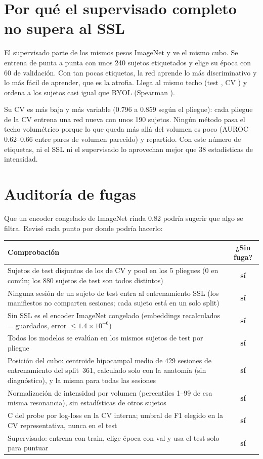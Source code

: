 \documentclass[11pt,a4paper]{article}
\newcommand{\si}{\textcolor{okc}{\textbf{sí}}}
\begin{document}
\section{Por qué el supervisado completo no supera al SSL}

El supervisado parte de los mismos pesos ImageNet y ve el mismo cubo. Se entrena de
punta a punta con unos 240 sujetos etiquetados y elige su época con 60 de validación.
Con tan pocas etiquetas, la red aprende lo más discriminativo y lo más fácil de aprender,
que es la atrofia. Llega al mismo techo (test \nsupTest, CV \nsupCV) y ordena a los
sujetos casi igual que BYOL (Spearman \nrhoByolSup).

Su CV es más baja y más variable (0.796 a 0.859 según el pliegue): cada pliegue de la CV
entrena una red nueva con unos 190 sujetos. Ningún método pasa el techo volumétrico
porque lo que queda más allá del volumen es poco (AUROC 0.62--0.66 entre pares de
volumen parecido) y repartido. Con este número de etiquetas, ni el SSL ni el supervisado
lo aprovechan mejor que 38 estadísticas de intensidad.

\section{Auditoría de fugas}

Que un encoder congelado de ImageNet rinda 0.82 podría sugerir que algo se filtra. Revisé
cada punto por donde podría hacerlo:

\begin{table}[H]
\centering\small
\begin{tabularx}{\textwidth}{@{}X c@{}}
\toprule
Comprobación & ¿Sin fuga? \\
\midrule
Sujetos de test disjuntos de los de CV y pool en los 5 pliegues (0 en común; los 880
sujetos de test son todos distintos) & \si \\
Ninguna sesión de un sujeto de test entra al entrenamiento SSL (los manifiestos no
comparten sesiones; cada sujeto está en un solo split) & \si \\
Sin SSL es el encoder ImageNet congelado (embeddings recalculados = guardados, error
$\le 1.4\times10^{-6}$) & \si \\
Todos los modelos se evalúan en los mismos sujetos de test por pliegue & \si \\
Posición del cubo: centroide hipocampal medio de 429 sesiones de entrenamiento del
split~361, calculado solo con la anatomía (sin diagnóstico), y la misma para todas las
sesiones & \si \\
Normalización de intensidad por volumen (percentiles 1--99 de esa misma resonancia),
sin estadísticas de otros sujetos & \si \\
C del probe por log-loss en la CV interna; umbral de F1 elegido en la CV representativa,
nunca en el test & \si \\
Supervisado: entrena con train, elige época con val y usa el test solo para puntuar & \si \\
\bottomrule
\end{tabularx}
\end{table}
\end{document}
